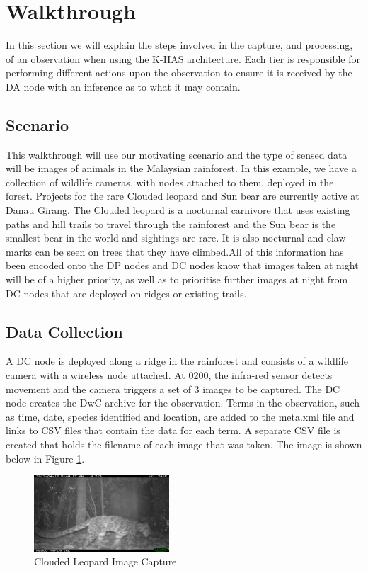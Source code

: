 	\section{Walkthrough}
		In this section we will explain the steps involved in the capture, and processing, of an observation when using the K-HAS architecture. Each tier is responsible for performing different actions upon the observation to ensure it is received by the DA node with an inference as to what it may contain.
		
		\subsection{Scenario}
			This walkthrough will use our motivating scenario and the type of sensed data will be images of animals in the Malaysian rainforest. In this example, we have a collection of wildlife cameras, with nodes attached to them, deployed in the forest. Projects for the rare Clouded leopard and Sun bear are currently active at Danau Girang. The Clouded leopard is a nocturnal carnivore that uses existing paths and hill trails to travel through the rainforest and the Sun bear is the smallest bear in the world and sightings are rare. It is also nocturnal and claw marks can be seen on trees that they have climbed.All of this information has been encoded onto the DP nodes and DC nodes know that images taken at night will be of a higher priority, as well as to prioritise further images at night from DC nodes that are deployed on ridges or existing trails.
			
		\subsection{Data Collection}
			A DC node is deployed along a ridge in the rainforest and consists of a wildlife camera with a wireless node attached. At 0200, the infra-red sensor detects movement and the camera triggers a set of 3 images to be captured. The DC node creates the DwC archive for the observation. Terms in the observation, such as time, date, species identified and location, are added to the meta.xml file and links to CSV files that contain the data for each term. A separate CSV file is created that holds the filename of each image that was taken. The image is shown below in Figure \ref{cl2}.
			
			\begin{figure}[!t]
			\centering
			\includegraphics[width=0.45\textwidth]{Chap4/figures/leopard2.JPG}
			\caption{Clouded Leopard Image Capture}
			\label{cl2}
			\end{figure}
			
